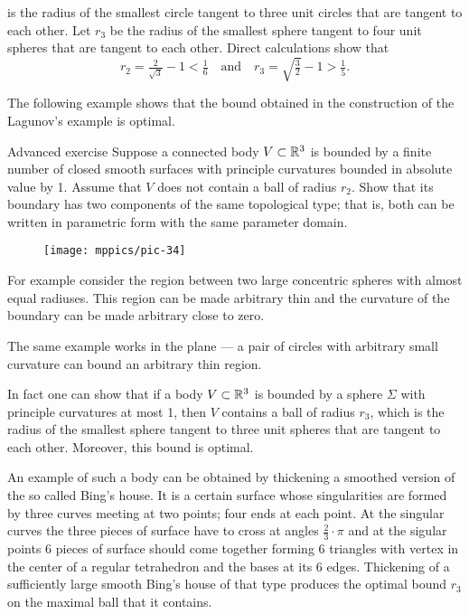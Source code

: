 is the radius of the smallest circle tangent to three unit circles that are tangent to each other.
Let $r_3$
be the radius of the smallest sphere tangent to four unit spheres that are tangent to each other.
Direct calculations show that 
\[r_2=\tfrac2{\sqrt{3}}-1< \tfrac16\quad\text{and}\quad r_3=\sqrt{\tfrac32}-1>\tfrac15.\]

The following example shows that the bound obtained in the construction of the Lagunov's example is optimal.

\begin{thm}{Advanced exercise}
Suppose a connected body $V\subset \mathbb{R}^3$ is bounded by a finite number of closed smooth surfaces with principle curvatures bounded in absolute value by 1.
Assume that $V$ does not contain a ball of radius $r_2$.
Show that its boundary has two components of the same topological type; 
that is, both can be written in parametric form with the same parameter domain. 
\end{thm}

\begin{wrapfigure}{o}{33 mm}
\vskip-4mm
\centering
\texttt{[image: mppics/pic-34]}
\vskip0mm
\end{wrapfigure}

For example consider the region between two large concentric spheres with almost equal radiuses. 
This region can be made arbitrary thin and the curvature of the boundary can be made arbitrary close to zero.

The same example works in the plane --- a pair of circles with arbitrary small curvature can bound an arbitrary thin region.

In fact one can show that if a body $V\subset \mathbb{R}^3$ is bounded by a sphere $\Sigma$ with principle curvatures at most 1, then $V$ contains a ball of radius $r_3$,
which is the radius of the smallest sphere tangent to three unit spheres that are tangent to each other.
Moreover, this bound is optimal.

An example of such a body can be obtained by thickening a smoothed version of the so called Bing's house.
It is a certain surface whose singularities are formed by three curves meeting at two points;
four ends at each point.
At the singular curves the three pieces of surface have to cross at angles $\tfrac23\cdot\pi$ and at the sigular points 6 pieces of surface should come together forming 6 triangles with vertex in the center of a regular tetrahedron and the bases at its 6 edges.
Thickening of a sufficiently large smooth Bing's house of that type produces the optimal bound $r_3$ on the maximal ball that it contains.





